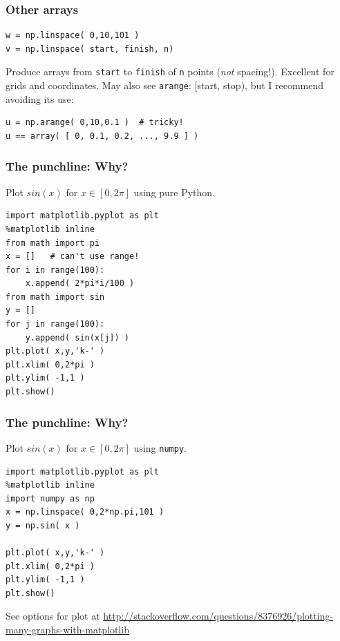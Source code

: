 \documentclass[11pt]{beamer}
\begin{document}
\begin{frame}[fragile]
  \frametitle{Other arrays}
  \Enlarge

  \begin{Verbatim}
w = np.linspace( 0,10,101 )
v = np.linspace( start, finish, n)
  \end{Verbatim}
  \begin{enumerate}
  \myitem  Produce arrays from \texttt{start} to \texttt{finish} of \texttt{n} points (\emph{not} spacing!).
  \myitem  Excellent for grids and coordinates.
  \myitem  May also see \texttt{arange}: [start, stop), but I recommend avoiding its use:
  \end{enumerate}
  \begin{Verbatim}
u = np.arange( 0,10,0.1 )  # tricky!
u == array( [ 0, 0.1, 0.2, ..., 9.9 ] )
  \end{Verbatim}
\end{frame}

\begin{frame}[fragile]
  \frametitle{The punchline:  Why?}

  Plot $sin(x)$ for $x \in \left[ 0, 2\pi \right]$ using pure Python.

  \begin{Verbatim}
import matplotlib.pyplot as plt
%matplotlib inline  
from math import pi
x = []   # can't use range!
for i in range(100):
    x.append( 2*pi*i/100 )
from math import sin
y = []
for j in range(100):
    y.append( sin(x[j]) )
plt.plot( x,y,'k-' )
plt.xlim( 0,2*pi )
plt.ylim( -1,1 )
plt.show()
  \end{Verbatim}
  
\end{frame}

\begin{frame}[fragile]
  \frametitle{The punchline:  Why?}
  \Enlarge

  Plot $sin(x)$ for $x \in \left[ 0, 2\pi \right]$ using \texttt{numpy}.

  \begin{Verbatim}
import matplotlib.pyplot as plt
%matplotlib inline  
import numpy as np
x = np.linspace( 0,2*np.pi,101 )
y = np.sin( x )

plt.plot( x,y,'k-' )
plt.xlim( 0,2*pi )
plt.ylim( -1,1 )
plt.show()
  \end{Verbatim}
  
 See options for plot at \url{http://stackoverflow.com/questions/8376926/plotting-many-graphs-with-matplotlib}
 
\end{frame}
\end{document}
